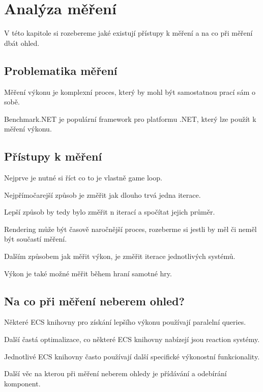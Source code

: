 \chapter{Analýza měření}
V této kapitole si rozebereme jaké existují přístupy k měření a na co při měření dbát ohled.

\section{Problematika měření}
Měření výkonu je komplexní proces, který by mohl být samostatnou prací sám o sobě.

Benchmark.NET je populární framework pro platformu .NET, který lze použít k měření výkonu.

\section{Přístupy k měření}
Nejprve je nutné si říct co to je vlastně game loop.

Nejpřímočarejší způsob je změřit jak dlouho trvá jedna iterace.

Lepší způsob by tedy bylo změřit n iterací a spočítat jejich průměr.

Rendering může být časově naročnější proces, rozeberme si jestli by měl či neměl být součastí měření.

Dalším způsobem jak měřit výkon, je změřit iterace jednotlivých systémů.

Výkon je také možné měřit během hraní samotné hry.


\section{Na co při měření neberem ohled?}
Některé ECS knihovny pro získání lepšího výkonu používají paralelní queries.

Další častá optimalizace, co některé ECS knihovny nabízejí jsou reaction systémy.

Jednotlivé ECS knihovny často používají další specifické výkonostní funkcionality.

Další věc na kterou při měření neberem ohledy je přídávání a odebírání komponent.

